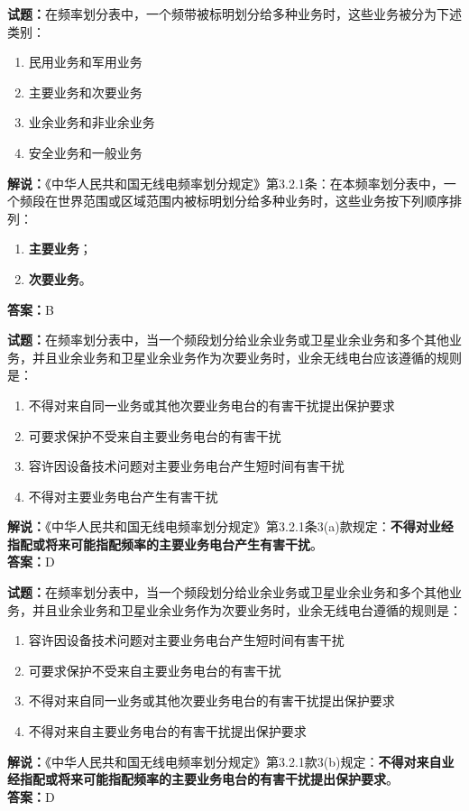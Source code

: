 \documentclass{ctexbook}
\begin{document}
\noindent\textbf{试题：}在频率划分表中，一个频带被标明划分给多种业务时，这些业务被分为下述类别：
\begin{enumerate}[leftmargin=3em]
  \item 民用业务和军用业务
  \item 主要业务和次要业务
  \item 业余业务和非业余业务
  \item 安全业务和一般业务
\end{enumerate}
\noindent\textbf{解说：}《中华人民共和国无线电频率划分规定》第3.2.1条：在本频率划分表中，一个频段在世界范围或区域范围内被标明划分给多种业务时，这些业务按下列顺序排列：
\begin{enumerate}[leftmargin=3em, label=\alph*)]
  \item \textbf{主要业务}；
  \item \textbf{次要业务}。
\end{enumerate}
\textbf{答案：}B

\vspace{\baselineskip}

\noindent\textbf{试题：}在频率划分表中，当一个频段划分给业余业务或卫星业余业务和多个其他业务，并且业余业务和卫星业余业务作为次要业务时，业余无线电台应该遵循的规则是：
\begin{enumerate}[leftmargin=3em]
  \item 不得对来自同一业务或其他次要业务电台的有害干扰提出保护要求
  \item 可要求保护不受来自主要业务电台的有害干扰
  \item 容许因设备技术问题对主要业务电台产生短时间有害干扰
  \item 不得对主要业务电台产生有害干扰
\end{enumerate}
\noindent\textbf{解说：}《中华人民共和国无线电频率划分规定》第3.2.1条3(a)款规定：\textbf{不得对业经指配或将来可能指配频率的主要业务电台产生有害干扰}。\\
\textbf{答案：}D

\vspace{\baselineskip}

\noindent\textbf{试题：}在频率划分表中，当一个频段划分给业余业务或卫星业余业务和多个其他业务，并且业余业务和卫星业余业务作为次要业务时，业余无线电台遵循的规则是：
\begin{enumerate}[leftmargin=3em]
  \item 容许因设备技术问题对主要业务电台产生短时间有害干扰
  \item 可要求保护不受来自主要业务电台的有害干扰
  \item 不得对来自同一业务或其他次要业务电台的有害干扰提出保护要求
  \item 不得对来自主要业务电台的有害干扰提出保护要求
\end{enumerate}
\noindent\textbf{解说：}《中华人民共和国无线电频率划分规定》第3.2.1款3(b)规定：\textbf{不得对来自业经指配或将来可能指配频率的主要业务电台的有害干扰提出保护要求}。\\\textbf{答案：}D
\end{document}
